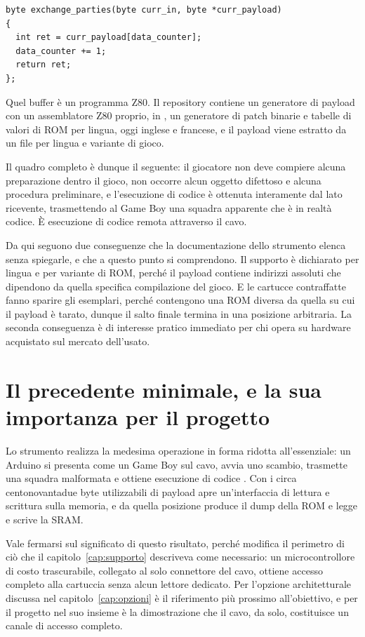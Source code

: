 \begin{verbatim}
byte exchange_parties(byte curr_in, byte *curr_payload)
{
  int ret = curr_payload[data_counter];
  data_counter += 1;
  return ret;
};
\end{verbatim}

Quel buffer è un programma Z80. Il repository contiene un generatore di payload con un assemblatore Z80 proprio, in , un generatore di patch binarie e tabelle di valori di ROM per lingua, oggi inglese e francese, e il payload viene estratto da un file per lingua e variante di gioco.

Il quadro completo è dunque il seguente: il giocatore non deve compiere alcuna preparazione dentro il gioco, non occorre alcun oggetto difettoso e alcuna procedura preliminare, e l'esecuzione di codice è ottenuta interamente dal lato ricevente, trasmettendo al Game Boy una squadra apparente che è in realtà codice. È esecuzione di codice remota attraverso il cavo.

Da qui seguono due conseguenze che la documentazione dello strumento elenca senza spiegarle, e che a questo punto si comprendono. Il supporto è dichiarato per lingua e per variante di ROM, perché il payload contiene indirizzi assoluti che dipendono da quella specifica compilazione del gioco. E le cartucce contraffatte fanno sparire gli esemplari, perché contengono una ROM diversa da quella su cui il payload è tarato, dunque il salto finale termina in una posizione arbitraria. La seconda conseguenza è di interesse pratico immediato per chi opera su hardware acquistato sul mercato dell'usato.

\section{Il precedente minimale, e la sua importanza per il progetto}

Lo strumento  realizza la medesima operazione in forma ridotta all'essenziale: un Arduino si presenta come un Game Boy sul cavo, avvia uno scambio, trasmette una squadra malformata e ottiene esecuzione di codice \cite{pksploit}. Con i circa centonovantadue byte utilizzabili di payload apre un'interfaccia di lettura e scrittura sulla memoria, e da quella posizione produce il dump della ROM e legge e scrive la SRAM.

Vale fermarsi sul significato di questo risultato, perché modifica il perimetro di ciò che il capitolo~\ref{cap:supporto} descriveva come necessario: un microcontrollore di costo trascurabile, collegato al solo connettore del cavo, ottiene accesso completo alla cartuccia senza alcun lettore dedicato. Per l'opzione architetturale discussa nel capitolo~\ref{cap:opzioni} è il riferimento più prossimo all'obiettivo, e per il progetto nel suo insieme è la dimostrazione che il cavo, da solo, costituisce un canale di accesso completo.

